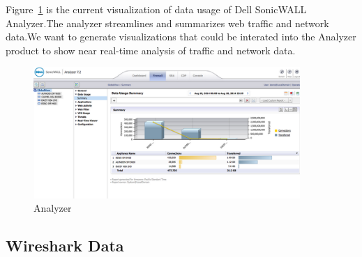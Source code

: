 \documentclass[paper=a4, fontsize=11pt]{report} %
\begin{document}
\begin{description}[style=nextline]
    \item[\href{http://www.sonicwall.com/us/en/products/Firewall-Analyzer.html}{Analyzer}]
    Figure~\ref{fig:analyzer} is the current visualization of data usage of Dell SonicWALL Analyzer.The analyzer streamlines and summarizes web traffic and network data.We want to generate visualizations that could be interated into the Analyzer product to show near real-time analysis of traffic and network data.
	   \begin{figure}[H]
        \begin{center}
            \includegraphics[width=0.9\textwidth]{analyzer.png}
        \end{center}
        \caption{Analyzer}\label{fig:analyzer}
    \end{figure}

\end{description}

\subsection{Wireshark Data} %
\label{sub:wireshark_data}
\end{document}

